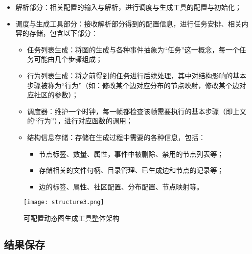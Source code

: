 \begin{itemize}
  \item 解析部分：相关配置的输入与解析，进行调度与生成工具的配置与初始化；
  \item 调度与生成工具部分：接收解析部分得到的配置信息，进行任务安排、相关内容的存储，包含以下部分：
  \begin{itemize}
    \item 任务列表生成：将图的生成与各种事件抽象为“任务”这一概念，每一个任务可能由几个步骤组成；
    \item 行为列表生成：将之前得到的任务进行后续处理，其中对结构影响的基本步骤被称为“行为”（如：修改某个边对应分布的节点映射，修改某个边对应社区的参数）；
    \item 调度器：维护一个时钟，每一帧都检查该帧需要执行的基本步骤（即上文的“行为”），进行对应函数的调用；
    \item 结构信息存储：存储在生成过程中需要的各种信息，包括：
    \begin{itemize}
      \item 节点标签、数量、属性，事件中被删除、禁用的节点列表等；
      \item 存储相关的文件句柄、目录管理、已生成边和节点的记录等；
      \item 边的标签、属性、社区配置、分布配置、节点映射等。
    \end{itemize}
  \end{itemize}
\end{itemize}

\begin{figure}
  \centering
  \texttt{[image: structure3.png]}
  \caption{可配置动态图生成工具整体架构}
  \label{fig:structure}
\end{figure}

\subsection{结果保存}

